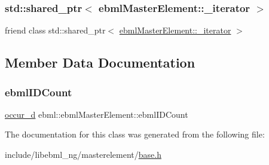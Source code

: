 \subsubsection{\texorpdfstring{std\+::shared\+\_\+ptr$<$ ebml\+Master\+Element\+::\+\_\+iterator $>$}{std::shared\_ptr< ebmlMasterElement::\_iterator >}}
{\footnotesize\ttfamily friend class std\+::shared\+\_\+ptr$<$ \mbox{\hyperlink{classebml_1_1ebmlMasterElement_1_1__iterator}{ebml\+Master\+Element\+::\+\_\+iterator}} $>$\hspace{0.3cm}{\ttfamily [friend]}}



\subsection{Member Data Documentation}
\mbox{\label{classebml_1_1ebmlMasterElement_a1d98e7686af827ef3bc4017a93c998af}} 
\subsubsection{\texorpdfstring{ebml\+I\+D\+Count}{ebmlIDCount}}
{\footnotesize\ttfamily \mbox{\hyperlink{namespaceebml_a4ecb956f78f49ef5e24e0d0db9b646f4}{occur\+\_\+d}} ebml\+::ebml\+Master\+Element\+::ebml\+I\+D\+Count\hspace{0.3cm}{\ttfamily [protected]}}



The documentation for this class was generated from the following file\+:\begin{DoxyCompactItemize}
\item 
include/libebml\+\_\+ng/masterelement/\mbox{\hyperlink{base_8h}{base.\+h}}\end{DoxyCompactItemize}
